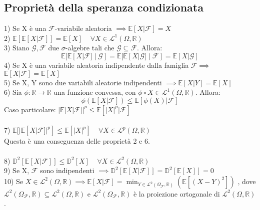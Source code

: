 \documentclass{article}
\begin{document}
\subsection*{Proprietà della speranza condizionata}
1) Se X è una $\mathcal{F}$-variabile aleatoria $\implies \mathbb{E}[X|\mathcal{F}] = X$\\
2) $\mathbb{E}[\mathbb{E}[X|\mathcal{F}]] = \mathbb{E}[X] \; \; \; \; \forall X \in \mathcal{L}^{1}(\Omega, \mathbb{R})$\\
3) Siano $\mathcal{G}, \mathcal{F}$ due $\sigma$-algebre tali che $\mathcal{G} \subseteq \mathcal{F}$. Allora:
\[ \mathbb{E}[\mathbb{E}[X|\mathcal{F}] \; | \; \mathcal{G}] = \mathbb{E}[\mathbb{E}[X|\mathcal{G}] \; | \; \mathcal{F}] = \mathbb{E}[X|\mathcal{G}] \]
4) Se X è una variabile aleatoria indipendente dalla famiglia $\mathcal{F} \implies$\\ $\mathbb{E}[X|\mathcal{F}] = \mathbb{E}[X]$\\
5) Se X, Y sono due variabili aleatorie indipendenti $\implies \mathbb{E}[X|Y] = \mathbb{E}[X]$\\
6) Sia $\phi: \mathbb{R} \to \mathbb{R}$ una funzione convessa, con $\phi \circ X \in \mathcal{L}^{1}(\Omega, \mathbb{R})$. Allora:
\[ \phi(\mathbb{E}[X|\mathcal{F}]) \leq \mathbb{E}[\phi(X)|\mathcal{F}] \]
Caso particolare: $|\mathbb{E}[X|\mathcal{F}]|^{p} \leq \mathbb{E}[|X|^{p}|\mathcal{F}]$\\ \\
7) $\mathbb{E}[|\mathbb{E}[X|\mathcal{F}]|^{p}] \leq \mathbb{E}[|X|^{p}] \; \; \; \; \forall X \in \mathcal{L}^{p}(\Omega, \mathbb{R})$\\
Questa è una conseguenza delle proprietà 2 e 6.\\ \\
8) $\mathbb{D}^{2}[\mathbb{E}[X|\mathcal{F}]] \leq \mathbb{D}^{2}[X] \; \; \; \; \forall X \in \mathcal{L}^{2}(\Omega, \mathbb{R})$\\
9) Se X, $\mathcal{F}$ sono indipendenti $\implies \mathbb{D}^{2}[\mathbb{E}[X|\mathcal{F}]] = \mathbb{D}^{2}[\mathbb{E}[X]] = 0$\\
10) Se $X \in \mathcal{L}^{2}(\Omega, \mathbb{R}) \implies \mathbb{E}[X|\mathcal{F}] = \min_{Y \in \mathcal{L}^{2}(\Omega_{\mathcal{F}}, \mathbb{R})}(\mathbb{E}[(X-Y)^{2}])$ , dove $\mathcal{L}^{2}(\Omega_{\mathcal{F}}, \mathbb{R}) \subseteq \mathcal{L}^{2}(\Omega, \mathbb{R})$ e $\mathcal{L}^{2}(\Omega_{\mathcal{F}}, \mathbb{R})$ è la proiezione ortogonale di $\mathcal{L}^{2}(\Omega, \mathbb{R})$.
\end{document}
